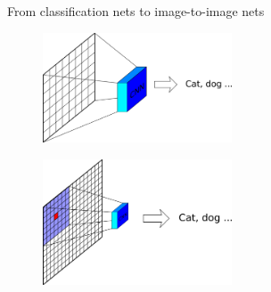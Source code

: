 \documentclass[xcolor=pdftex,dvipsnames,table,mathserif]{beamer}
\newcommand{\source}[1]{\begin{textblock*}{4cm}(8.7cm,8.6cm)
    \begin{beamercolorbox}[ht=0.5cm,right]{framesource}
      \usebeamerfont{framesource}\usebeamercolor[fg]{framesource} Credits: {#1}
    \end{beamercolorbox}
\end{textblock*}}
\begin{document}






\begin{frame}{From classification nets to image-to-image nets}

      \begin{figure}
      \includegraphics[width=0.5\textwidth]{image_classif.png}
      \end{figure}

      \pause

      \begin{figure}
      \includegraphics[width=0.5\textwidth]{image_transf.png}
      \end{figure}


\end{frame}
\end{document}
